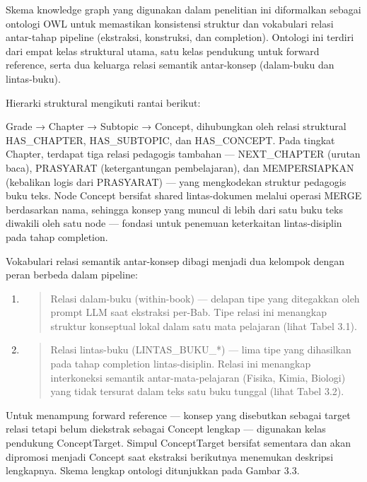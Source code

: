\documentclass[
]{article}
\begin{document}
Skema knowledge graph yang digunakan dalam penelitian ini diformalkan
sebagai ontologi OWL untuk memastikan konsistensi struktur dan
vokabulari relasi antar-tahap pipeline (ekstraksi, konstruksi, dan
completion). Ontologi ini terdiri dari empat kelas struktural utama,
satu kelas pendukung untuk forward reference, serta dua keluarga relasi
semantik antar-konsep (dalam-buku dan lintas-buku).

Hierarki struktural mengikuti rantai berikut:

Grade → Chapter → Subtopic → Concept, dihubungkan oleh relasi struktural
HAS\_CHAPTER, HAS\_SUBTOPIC, dan HAS\_CONCEPT. Pada tingkat Chapter,
terdapat tiga relasi pedagogis tambahan --- NEXT\_CHAPTER (urutan baca),
PRASYARAT (ketergantungan pembelajaran), dan MEMPERSIAPKAN (kebalikan
logis dari PRASYARAT) --- yang mengkodekan struktur pedagogis buku teks.
Node Concept bersifat shared lintas-dokumen melalui operasi MERGE
berdasarkan nama, sehingga konsep yang muncul di lebih dari satu buku
teks diwakili oleh satu node --- fondasi untuk penemuan keterkaitan
lintas-disiplin pada tahap completion.

Vokabulari relasi semantik antar-konsep dibagi menjadi dua kelompok
dengan peran berbeda dalam pipeline:

\begin{enumerate}
\def\labelenumi{\arabic{enumi}.}
\item
  \begin{quote}
  Relasi dalam-buku (within-book) --- delapan tipe yang ditegakkan oleh
  prompt LLM saat ekstraksi per-Bab. Tipe relasi ini menangkap struktur
  konseptual lokal dalam satu mata pelajaran (lihat Tabel 3.1).
  \end{quote}
\item
  \begin{quote}
  Relasi lintas-buku (LINTAS\_BUKU\_*) --- lima tipe yang dihasilkan
  pada tahap completion lintas-disiplin. Relasi ini menangkap
  interkoneksi semantik antar-mata-pelajaran (Fisika, Kimia, Biologi)
  yang tidak tersurat dalam teks satu buku tunggal (lihat Tabel 3.2).
  \end{quote}
\end{enumerate}

Untuk menampung forward reference --- konsep yang disebutkan sebagai
target relasi tetapi belum diekstrak sebagai Concept lengkap ---
digunakan kelas pendukung ConceptTarget. Simpul ConceptTarget bersifat
sementara dan akan dipromosi menjadi Concept saat ekstraksi berikutnya
menemukan deskripsi lengkapnya. Skema lengkap ontologi ditunjukkan pada
Gambar 3.3.
\end{document}
